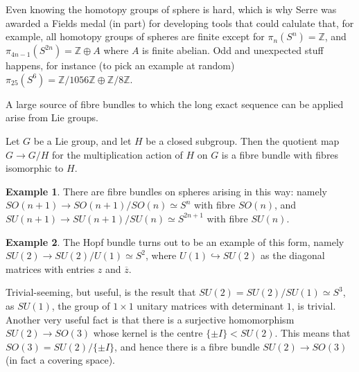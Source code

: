 \documentclass{tufte-handout}
\def\into {\hookrightarrow}
\def\ZZ{\mathbb{Z}}
\newcommand{\lecturenum}[1]{\marginnote{\color{red}Lecture #1}}
\theoremstyle{definition}
\newtheorem{example}{Example}
\begin{document}
Even knowing the homotopy groups of sphere is hard, which is why Serre was awarded a Fields medal (in part) for developing tools that could calulate that, for example, all homotopy groups of spheres are finite except for $\pi_n(S^n)=\ZZ$, and $\pi_{4n-1}(S^{2n}) = \ZZ \oplus A$ where $A$ is finite abelian. Odd and unexpected stuff happens, for instance (to pick an example at random) $\pi_{25}(S^6) = \ZZ/{1056 \ZZ} \oplus \ZZ/8\ZZ$.

A\lecturenum{19} large source of fibre bundles to which the long exact sequence can be applied arise from Lie groups.

Let $G$ be a Lie group, and let $H$ be a closed subgroup. Then the quotient map $G\to G/H$ for the multiplication action of $H$ on $G$ is a fibre bundle with fibres isomorphic to $H$.

\begin{example}
There are fibre bundles on spheres arising in this way: namely $SO(n+1) \to SO(n+1)/SO(n) \simeq S^n$ with fibre $SO(n)$, and $SU(n+1) \to SU(n+1)/SU(n) \simeq S^{2n+1}$ with fibre $SU(n)$.
\end{example}

\begin{example}
The Hopf bundle turns out to be an example of this form, namely $SU(2) \to SU(2)/U(1) \simeq S^2$, where $U(1) \into SU(2)$ as the diagonal matrices with entries $z$ and $\overline{z}$.
\end{example}

Trivial-seeming, but useful, is the result that $SU(2) = SU(2)/SU(1) \simeq S^3$, as $SU(1)$, the group of $1\times 1$ unitary matrices with determinant $1$, is trivial. Another very useful fact is that there is a surjective homomorphism $SU(2) \to SO(3)$ whose kernel is the centre $\{\pm I\} < SU(2)$. This means that $SO(3) = SU(2)/\{\pm I\}$, and hence there is a fibre bundle $SU(2) \to SO(3)$ (in fact a covering space).
\end{document}
